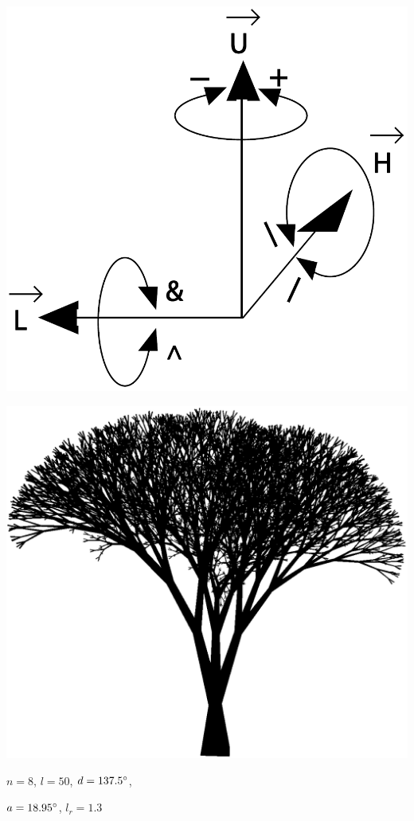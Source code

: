 \newpage
\begin{center}
	\includegraphics[height=1\textheight]{images/CH2_Turtle3D.png}
	\cite[S.19]{ABOP:04}
\end{center}





\newpage
\begin{center}
	\begin{minipage}[c]{0.6\textwidth}
		\centering
		\includegraphics[height=.75\textheight]{images/CH2_3DTreeP61B_Angle_18_95.png}
	\end{minipage}
	\begin{minipage}[c]{0.35\textwidth}
			$n=8$, $l=50$, $d=137.5\degree$, 
			
			$a=18.95\degree$, $l_r = 1.3$
	\end{minipage}
\end{center}

